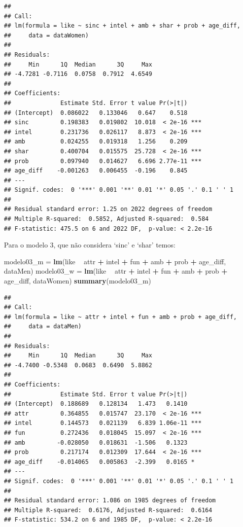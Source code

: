 \documentclass[]{article}
\newenvironment{Shaded}{\begin{snugshade}}{\end{snugshade}}
\newcommand{\KeywordTok}[1]{\textcolor[rgb]{0.13,0.29,0.53}{\textbf{#1}}}
\newcommand{\NormalTok}[1]{#1}
\newcommand{\OperatorTok}[1]{\textcolor[rgb]{0.81,0.36,0.00}{\textbf{#1}}}
\newcommand{\StringTok}[1]{\textcolor[rgb]{0.31,0.60,0.02}{#1}}
\begin{document}
\begin{verbatim}
## 
## Call:
## lm(formula = like ~ sinc + intel + amb + shar + prob + age_diff, 
##     data = dataWomen)
## 
## Residuals:
##     Min      1Q  Median      3Q     Max 
## -4.7281 -0.7116  0.0758  0.7912  4.6549 
## 
## Coefficients:
##              Estimate Std. Error t value Pr(>|t|)    
## (Intercept)  0.086022   0.133046   0.647    0.518    
## sinc         0.198383   0.019802  10.018  < 2e-16 ***
## intel        0.231736   0.026117   8.873  < 2e-16 ***
## amb          0.024255   0.019318   1.256    0.209    
## shar         0.400704   0.015575  25.728  < 2e-16 ***
## prob         0.097940   0.014627   6.696 2.77e-11 ***
## age_diff    -0.001263   0.006455  -0.196    0.845    
## ---
## Signif. codes:  0 '***' 0.001 '**' 0.01 '*' 0.05 '.' 0.1 ' ' 1
## 
## Residual standard error: 1.25 on 2022 degrees of freedom
## Multiple R-squared:  0.5852, Adjusted R-squared:  0.584 
## F-statistic: 475.5 on 6 and 2022 DF,  p-value: < 2.2e-16
\end{verbatim}

Para o modelo 3, que não considera `sinc' e `shar' temos:

\begin{Shaded}
\begin{Highlighting}[]
\NormalTok{modelo03_m =}\StringTok{ }\KeywordTok{lm}\NormalTok{(like }\OperatorTok{~}\StringTok{ }\NormalTok{attr }\OperatorTok{+}\StringTok{ }\NormalTok{intel }\OperatorTok{+}\StringTok{ }\NormalTok{fun }\OperatorTok{+}\StringTok{ }\NormalTok{amb }\OperatorTok{+}\StringTok{  }\NormalTok{prob }\OperatorTok{+}\StringTok{ }\NormalTok{age_diff, dataMen)  }
\NormalTok{modelo03_w =}\StringTok{ }\KeywordTok{lm}\NormalTok{(like }\OperatorTok{~}\StringTok{ }\NormalTok{attr }\OperatorTok{+}\StringTok{ }\NormalTok{intel }\OperatorTok{+}\StringTok{ }\NormalTok{fun }\OperatorTok{+}\StringTok{ }\NormalTok{amb }\OperatorTok{+}\StringTok{  }\NormalTok{prob }\OperatorTok{+}\StringTok{ }\NormalTok{age_diff, dataWomen)}
\KeywordTok{summary}\NormalTok{(modelo03_m)}
\end{Highlighting}
\end{Shaded}

\begin{verbatim}
## 
## Call:
## lm(formula = like ~ attr + intel + fun + amb + prob + age_diff, 
##     data = dataMen)
## 
## Residuals:
##     Min      1Q  Median      3Q     Max 
## -4.7400 -0.5348  0.0683  0.6490  5.8862 
## 
## Coefficients:
##              Estimate Std. Error t value Pr(>|t|)    
## (Intercept)  0.188689   0.128134   1.473   0.1410    
## attr         0.364855   0.015747  23.170  < 2e-16 ***
## intel        0.144573   0.021139   6.839 1.06e-11 ***
## fun          0.272436   0.018045  15.097  < 2e-16 ***
## amb         -0.028050   0.018631  -1.506   0.1323    
## prob         0.217174   0.012309  17.644  < 2e-16 ***
## age_diff    -0.014065   0.005863  -2.399   0.0165 *  
## ---
## Signif. codes:  0 '***' 0.001 '**' 0.01 '*' 0.05 '.' 0.1 ' ' 1
## 
## Residual standard error: 1.086 on 1985 degrees of freedom
## Multiple R-squared:  0.6176, Adjusted R-squared:  0.6164 
## F-statistic: 534.2 on 6 and 1985 DF,  p-value: < 2.2e-16
\end{verbatim}
\end{document}
